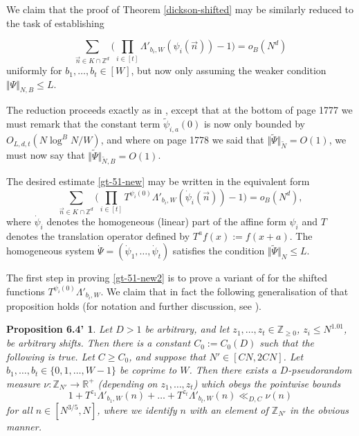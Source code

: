 \documentclass[11pt]{amsart}
\numberwithin{equation}{section}  %
\theoremstyle{remark}
\theoremstyle{plain}
\newtheorem*{prop64new}{Proposition 6.4'}
\numberwithin{equation}{section}
\newcommand{\Z}{\mathbb{Z}}
\newcommand{\R}{\mathbb{R}}
\renewcommand{\leq}{\leqslant}
\renewcommand{\geq}{\geqslant}
\renewcommand{\(}{\left(}
\renewcommand{\)}{\right)}
\newcommand{\vect}[1]{{\ensuremath{\vec{#1}}}}
\begin{document}
We claim that the proof of Theorem \ref{dickson-shifted} may be similarly reduced to the task of establishing 

\begin{equation}\label{gt-51-new} \sum_{\vect{n} \in K \cap \Z^d} \Bigg(\prod_{i \in [t]} \Lambda'_{b_i, W}(\psi_i(\vect{n})) - 1\Bigg) = o_B(N^d)\end{equation} uniformly for $b_1,\dots, b_t \in [W]$, but now only assuming the weaker condition $\Vert \Psi \Vert_{N, B} \leq L$.

The reduction proceeds exactly as in \cite[Chapter 5]{gt-linearprimes}, except that at the bottom of page 1777 we must remark that the constant term $\tilde\psi_{i,a}(0)$ is now only bounded by $O_{L,d,t}(N\log^B N/W)$, and where on page 1778 we said that $\Vert \tilde\Psi \Vert_{\tilde N} = O(1)$, we must now say that $\Vert \tilde\Psi \Vert_{\tilde N, B} = O(1)$.


The desired estimate \eqref{gt-51-new} may be written in the equivalent form
\begin{equation}\label{gt-51-new2} \sum_{\vect{n} \in K \cap \Z^d} \Bigg(\prod_{i \in [t]} T^{\psi_i(0)}\Lambda'_{b_i, W}(\dot\psi_i(\vect{n})) - 1\Bigg) = o_B(N^d),\end{equation} where $\dot\psi_i$ denotes the homogeneous (linear) part of the affine form $\psi_i$ and $T$ denotes the translation operator defined by $T^af(x) := f(x + a)$. The homogeneous system $\dot\Psi = (\dot\psi_1,\dots, \dot\psi_t)$ satisfies the condition $\Vert \tilde\Psi \Vert_N \leq L$.

The first step in proving \eqref{gt-51-new2} is to prove a variant of \cite[Proposition 6.4]{gt-linearprimes} for the shifted functions $T^{\psi_i(0)} \Lambda'_{b_i, W}$. We claim that in fact the following generalisation of that proposition holds (for notation and further discussion, see \cite[Chapter 6]{gt-linearprimes}).

\begin{prop64new}\label{shift-majorant}
Let $D > 1$ be arbitrary, and let $z_1,\dots, z_t \in \Z_{\geq 0}$, $z_i \leq N^{1.01}$, be arbitrary shifts. Then there is a constant $C_0 := C_0(D)$ such that the following is true. Let $C \geq C_0$, and suppose that $N' \in [CN,2CN]$. Let $b_1,\dots, b_t \in \{0,1,\dots, W-1\}$ be coprime to $W$. Then there exists a $D$-pseudorandom measure $\nu : \Z_{N'} \rightarrow \R^{+}$ \textup{(}depending on $z_1,\dots, z_t$\textup{)} which obeys the pointwise bounds
\[ 1 + T^{z_1}\Lambda'_{b_1, W}(n) + \dots + T^{z_t}\Lambda'_{b_t, W}(n) \ll_{D,C} \nu(n)\] for all $n \in [N^{3/5}, N]$, where we identify $n$ with an element of $\Z_{N'}$ in the obvious manner.
\end{prop64new}
\end{document}
